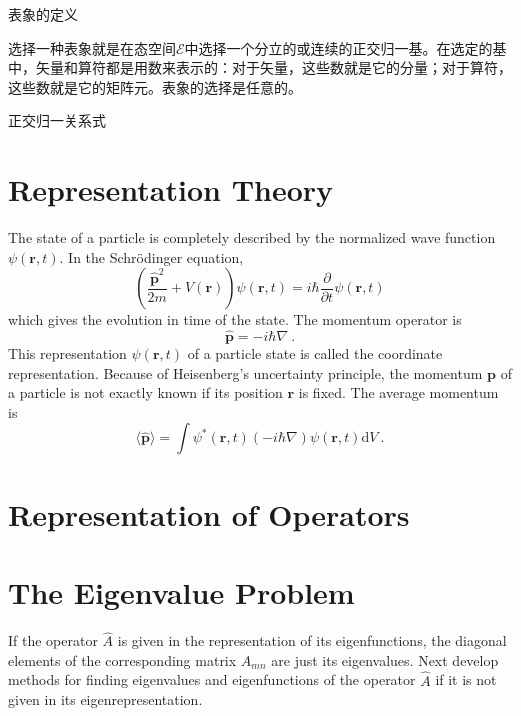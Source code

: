 \documentclass[11pt,a4paper]{article}
\renewcommand{\vec}[1]{\boldsymbol{#1}}
\newcommand{\dif}{\mathrm{d}}
\begin{document}
\cite{1986qmv1.book.....C} 表象的定义

选择一种表象就是在态空间$\mathscr{E}$中选择一个分立的或连续的正交归一基。在选定的基中，矢量和算符都是用数来表示的：对于矢量，这些数就是它的分量；对于算符，这些数就是它的矩阵元。表象的选择是任意的。


正交归一关系式








\section{Representation Theory}
\cite{2000greiner} The state of a particle is completely described by the normalized wave function $\psi(\vec{r}, t)$. In the Schr\"odinger equation, 
\begin{equation}
\left(\dfrac{\vec{\hat{p}}^2}{2m} +V(\vec{r}) \right)\psi(\vec{r}, t) = i\hbar \dfrac{\partial }{\partial t} \psi(\vec{r}, t)
\end{equation}
which gives the evolution in time of the state. The momentum operator is
\begin{equation}
\vec{\hat{p}} = -i\hbar \nabla ~.
\end{equation}
This representation $\psi(\vec{r}, t)$ of a particle state is called the coordinate representation. Because of Heisenberg's uncertainty principle, the momentum $\vec{p}$ of a particle is not exactly known if its position $\vec{r}$ is fixed. The average momentum is 
\begin{equation}
\langle \vec{\hat{p}} \rangle = \int \psi^\ast(\vec{r}, t) (-i\hbar \nabla) \psi(\vec{r}, t) \dif V ~.
\end{equation}


\section{Representation of Operators}










\section{The Eigenvalue Problem}
If the operator $\hat{A}$ is given in the representation of its eigenfunctions, the diagonal elements of the corresponding matrix $A_{mn}$ are just its eigenvalues. Next develop methods for finding eigenvalues and eigenfunctions of the operator $\hat{A}$ if it is not given in its eigenrepresentation. 
\end{document}
